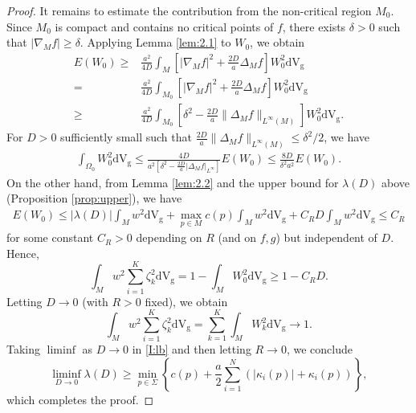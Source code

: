 \documentclass[12pt,reqno]{amsart}
\newcommand{\V}{\mathrm{d} \mathrm{V_g}}
\newcommand{\grad}{\nabla_M}
\numberwithin{equation}{section}
\begin{document}
\begin{proof}
It remains to estimate the contribution from the non-critical region \(M_0\). Since \(M_0\) is compact and contains no critical points of \(f\), there exists \(\delta>0\) such that \(|\grad f| \geq \delta\). Applying Lemma \ref{lem:2.1} to \(W_0\), we obtain
\begin{align*}
E(W_0)\ge &\frac{a^2}{4D}  \int_{M} \left[ | \nabla_M f|^2 +
     \frac{2D}{a} \Delta_M f \right] W_0^2 \mathrm{d} \mathrm{V_g}\\
     =&\frac{a^2}{4D}  \int_{M_0} \left[ | \nabla_M f|^2 +
     \frac{2D}{a} \Delta_M f \right] W_0^2 \mathrm{d} \mathrm{V_g}\\
     \ge& \frac{a^2}{4D}  \int_{M_0} \left[ \delta^2 -
     \frac{2D}{a} \|\Delta_M f \|_{L^\infty(M)}\right] W_0^2 \mathrm{d} \mathrm{V_g}.
\end{align*}
For $D>0$ sufficiently small such that 
\(\frac{2D}{a}\|\Delta_M f\|_{L^\infty(M)} \le \delta^2/2\), we have
\begin{align*}
\int_{\Omega_0}  W_0^2 \mathrm{d} \mathrm{V_g}\leq
\frac{4D}{a^2\left[ \delta^2 -
     \frac{2D}{a} |\Delta_M f |_{L^\infty}\right]}E(W_0)\leq \frac{8 D}{\delta^2 a^2}E(W_0).
\end{align*}
On the other hand, from Lemma \ref{lem:2.2} and the upper bound for $\lambda(D)$ above (Proposition \ref{prop:upper}), we have 
\begin{align*}
E(W_0)\leq |\lambda(D)|\int_M w^2\V+\max_{p\in M}c(p)\int_M w^2\V+C_R D\int_M w^2\V \leq C_R
\end{align*}
for some constant \(C_R>0\) depending on \(R\) (and on \(f,g\)) but independent of \(D\). Hence,    
\[
\int_Mw^2 \sum_{i=1}^K \zeta_k^2\V=1-\int_M W_0^2 \V\ge 1-C_R D.
\]
Letting \(D\to0\) (with \(R>0\) fixed), we obtain
\[
\int_Mw^2 \sum_{i=1}^K \zeta_k^2\V=\sum_{k=1}^K \int_M W_k^2 \V \to 1.
\]
Taking \(\liminf\) as \(D \to 0\) in \eqref{I:lb} and then letting \(R \to 0\), we conclude
\[
\liminf_{D \to 0} \lambda(D) \geq \min_{p \in \Sigma} \left\{ c(p) + \frac{a}{2} \sum_{i=1}^N (|\kappa_i(p)| + \kappa_i(p)) \right\},
\]
which completes the proof.  
\end{proof}
\end{document}
